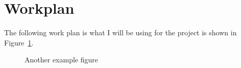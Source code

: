 \documentclass{sj_surrey_article}
\begin{document}
\section{Workplan}
The following work plan is what I will be using for the project is shown in Figure~\ref{fig:sample2}.

\begin{figure}[thp]
   \begin{center}
   \end{center}
   \caption{Another example figure}
   \label{fig:sample2}
\end{figure}

\appendix
%
%



\end{document}
